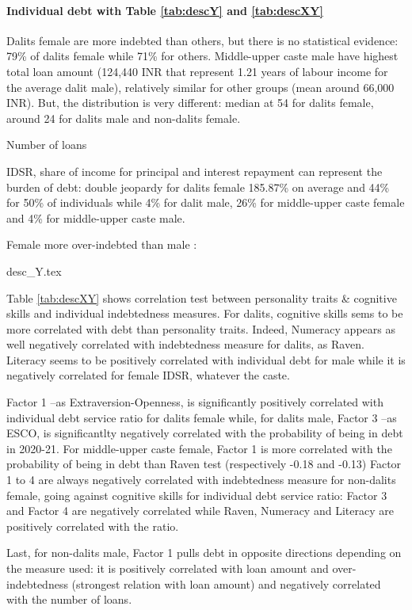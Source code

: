 \documentclass[a4paper, 11pt, onecolumn]{article}
\begin{document}
\paragraph{Individual debt with Table \ref{tab:descY} and \ref{tab:descXY}}

Dalits female are more indebted than others, but there is no statistical evidence: 79\% of dalits female while 71\% for others.
Middle-upper caste male have highest total loan amount (124,440 INR that represent 1.21 years of labour income for the average dalit male), relatively similar for other groups (mean around 66,000 INR).
But, the distribution is very different: median at 54 for dalits female, around 24 for dalits male and non-dalits female.

Number of loans 

IDSR, share of income for principal and interest repayment can represent the burden of debt: double jeopardy for dalits female 185.87\% on average and 44\% for 50\% of individuals while 4\% for dalit male, 26\% for middle-upper caste female and 4\% for middle-upper caste male.


Female more over-indebted than male :


{desc_Y.tex}

Table \ref{tab:descXY} shows correlation test between personality traits \& cognitive skills and individual indebtedness measures.
For dalits, cognitive skills sems to be more correlated with debt than personality traits.
Indeed, Numeracy appears as well negatively correlated with indebtedness measure for dalits, as Raven.
Literacy seems to be positively correlated with individual debt for male while it is negatively correlated for female IDSR, whatever the caste.

Factor 1 --as Extraversion-Openness, is significantly positively correlated with individual debt service ratio for dalits female while, for dalits male, Factor 3 --as ESCO, is significantlty negatively correlated with the probability of being in debt in 2020-21.
For middle-upper caste female, Factor 1 is more correlated with the probability of being in debt than Raven test (respectively -0.18 and -0.13) 
Factor 1 to 4 are always negatively correlated with indebtedness measure for non-dalits female, going against cognitive skills for individual debt service ratio: Factor 3 and Factor 4 are negatively correlated while Raven, Numeracy and Literacy are positively correlated with the ratio.

Last, for non-dalits male, Factor 1 pulls debt in opposite directions depending on the measure used: it is positively correlated with loan amount and over-indebtedness (strongest relation with loan amount) and negatively correlated with the number of loans.
\end{document}
